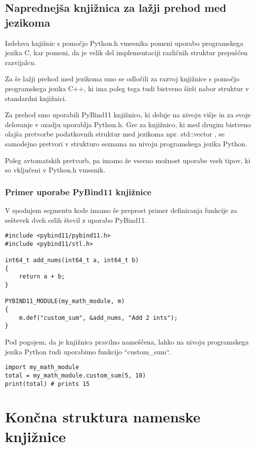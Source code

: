 \documentclass[a4paper,12pt,openright]{book}
\begin{document}
    \subsection{Naprednejša knjižnica za lažji prehod med jezikoma}

    Izdelava knjižnic s pomočjo Python.h vmesnika pomeni uporabo programskega jezika C, kar pomeni, da je velik del implementaciji različnih struktur prepuščen razvijalcu.
    
    Za še lažji prehod med jezikoma smo se odločili za razvoj knjižnice s pomočjo programskega jezika C++, ki ima poleg tega tudi bistveno širši nabor struktur v standardni knjižnici. 

    Za prehod smo uporabili PyBind11 \cite{PYBIND11_GITHUB} knjižnico, ki deluje na nivoju višje in za svoje delovanje v ozadju uporablja Python.h. Gre za knjižnico, ki med drugim bistveno olajša pretvorbe podatkovnih struktur med jezikoma npr. std::vector \cite{CPP_VECTOR}, se samodejno pretvori v strukturo seznama na nivoju programskega jezika Python.

    Poleg avtomatskih pretvorb, pa imamo že vseeno možnost uporabe vseh tipov, ki so vključeni v Python.h vmesnik.

    \subsubsection{Primer uporabe PyBind11 knjižnice}
    V spodnjem segmentu kode imamo še preprost primer definiranja funkcije za seštevek dveh celih števil z uporabo PyBind11.
\begin{verbatim}
#include <pybind11/pybind11.h>
#include <pybind11/stl.h>

int64_t add_nums(int64_t a, int64_t b)
{
    return a + b;
}

PYBIND11_MODULE(my_math_module, m)
{
    m.def("custom_sum", &add_nums, "Add 2 ints");
}
\end{verbatim}

    \noindent
    Pod pogojem, da je knjižnica pravilno nameščena, lahko na nivoju programskega jezika Python tudi uporabimo funkcijo ``custom\_sum``.
\begin{verbatim}
import my_math_module
total = my_math_module.custom_sum(5, 10)
print(total) # prints 15
\end{verbatim}

    \newpage
    \section{Končna struktura namenske knjižnice}
\end{document}
